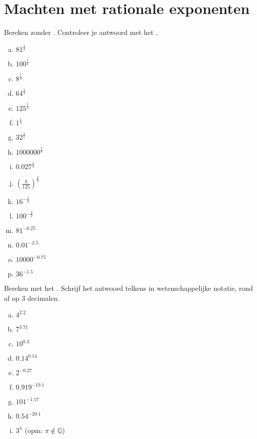 \documentclass[12pt,twoside]{article}
\begin{document}
\pagebreak
\section{Machten met rationale exponenten}

\begin{oefening}
Bereken zonder . Controleer je antwoord met het .
\begin{multicols}{3}
\begin{enumerate}[(a)]
  \itemsep.5em
  \item ${81}^{\frac{1}{2}}$
  \item ${100}^{\frac{1}{2}}$
  \item ${8}^{\frac{1}{3}}$
  \item ${64}^{\frac{1}{3}}$
  \item ${125}^{\frac{1}{3}}$
  \item ${1}^{\frac{1}{4}}$
  \item ${32}^{\frac{1}{5}}$
  \item ${1000000}^{\frac{1}{6}}$
  \item ${0.027}^{\frac{1}{3}}$
  \item $\left(\frac{8}{125}\right)^{\frac{2}{3}}$
  \item ${16}^{-\frac{1}{4}}$
  \item ${100}^{-\frac{3}{2}}$
  \item ${81}^{-0.25}$
  \item ${0.01}^{-2.5}$
  \item ${10000}^{-0.75}$
  \item ${36}^{-1.5}$
\end{enumerate}
\end{multicols}
\end{oefening}

\begin{oefening}
Bereken met het . Schrijf het antwoord telkens in wetenschappelijke notatie, rond af op 3 decimalen.
\begin{multicols}{3}
\begin{enumerate}[(a)]
  \itemsep.5em
  \item ${4}^{2.2}$
  \item ${7}^{3.71}$
  \item ${10}^{0.3}$
  \item ${0.14}^{0.14}$
  \item ${2}^{-0.27}$
  \item ${0.919}^{-19.1}$
  \item ${101}^{-1.17}$
  \item ${0.54}^{-20.1}$
  \item $3^\pi$ (opm: $\pi\notin\mathbb{Q}$)
\end{enumerate}
\end{multicols}
\end{oefening}
\end{document}
